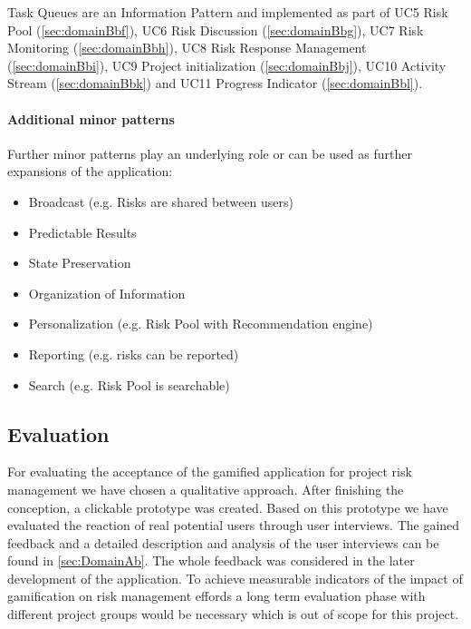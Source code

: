Task Queues are an Information Pattern and implemented as part of \ac{UC}5 Risk Pool (\ref{sec:domainBbf}), \ac{UC}6 Risk Discussion (\ref{sec:domainBbg}), \ac{UC}7 Risk Monitoring (\ref{sec:domainBbh}), \ac{UC}8 Risk Response Management (\ref{sec:domainBbi}), \ac{UC}9 Project initialization (\ref{sec:domainBbj}), \ac{UC}10 Activity Stream (\ref{sec:domainBbk}) and \ac{UC}11 Progress Indicator (\ref{sec:domainBbl}).

\paragraph*{Additional minor patterns}
Further minor patterns play an underlying role or can be used as further expansions of the application:
\begin{itemize}
	\item Broadcast (e.g. Risks are shared between users)
	\item Predictable Results
	\item State Preservation
	\item Organization of Information
	\item Personalization (e.g. Risk Pool with Recommendation engine)
	\item Reporting (e.g. risks can be reported)
	\item Search (e.g. Risk Pool is searchable)
\end{itemize}


\subsection{Evaluation}
\label{sec:domainCd}


For evaluating the acceptance of the gamified application for project risk management we have chosen a qualitative approach. After finishing the conception, a clickable prototype was created. Based on this prototype we have evaluated the reaction of real potential users through user interviews. The gained feedback and a detailed description and analysis of the user interviews can be found in \ref{sec:DomainAb}.
The whole feedback was considered in the later development of the application. To achieve measurable indicators of the impact of gamification on risk management effords a long term evaluation phase with different project groups would be necessary which is out of scope for this project.
